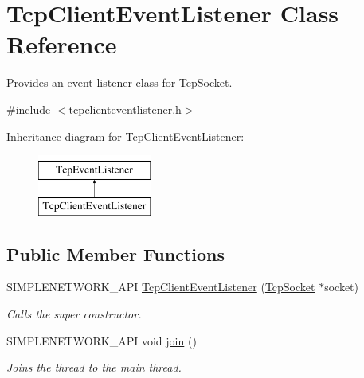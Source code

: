 \hypertarget{class_tcp_client_event_listener}{}\section{Tcp\+Client\+Event\+Listener Class Reference}
\label{class_tcp_client_event_listener}


Provides an event listener class for \mbox{\hyperlink{class_tcp_socket}{Tcp\+Socket}}.  




{\ttfamily \#include $<$tcpclienteventlistener.\+h$>$}

Inheritance diagram for Tcp\+Client\+Event\+Listener\+:\begin{figure}[H]
\begin{center}
\leavevmode
\includegraphics[height=2.000000cm]{class_tcp_client_event_listener}
\end{center}
\end{figure}
\subsection*{Public Member Functions}
\begin{DoxyCompactItemize}
\item 
S\+I\+M\+P\+L\+E\+N\+E\+T\+W\+O\+R\+K\+\_\+\+A\+PI \mbox{\hyperlink{class_tcp_client_event_listener_aec59e53888849d543205bc501743e2ab}{Tcp\+Client\+Event\+Listener}} (\mbox{\hyperlink{class_tcp_socket}{Tcp\+Socket}} $\ast$socket)
\begin{DoxyCompactList}\small\item\em Calls the super constructor. \end{DoxyCompactList}\item 
\mbox{\label{class_tcp_client_event_listener_a6ca2691fe23a24f538e02c1a3db3efc7}} 
S\+I\+M\+P\+L\+E\+N\+E\+T\+W\+O\+R\+K\+\_\+\+A\+PI void \mbox{\hyperlink{class_tcp_client_event_listener_a6ca2691fe23a24f538e02c1a3db3efc7}{join}} ()
\begin{DoxyCompactList}\small\item\em Joins the thread to the main thread. \end{DoxyCompactList}\end{DoxyCompactItemize}
